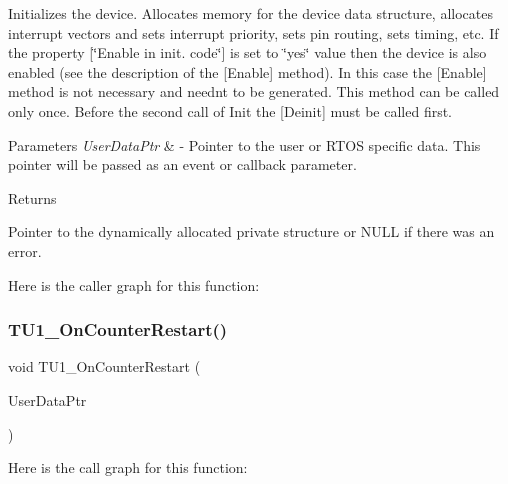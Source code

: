 Initializes the device. Allocates memory for the device data structure, allocates interrupt vectors and sets interrupt priority, sets pin routing, sets timing, etc. If the property \mbox{[}\char`\"{}\+Enable in init. code\char`\"{}\mbox{]} is set to \char`\"{}yes\char`\"{} value then the device is also enabled (see the description of the \mbox{[}Enable\mbox{]} method). In this case the \mbox{[}Enable\mbox{]} method is not necessary and needn\textquotesingle{}t to be generated. This method can be called only once. Before the second call of Init the \mbox{[}Deinit\mbox{]} must be called first. 


\begin{DoxyParams}{Parameters}
{\em User\+Data\+Ptr} & -\/ Pointer to the user or R\+T\+OS specific data. This pointer will be passed as an event or callback parameter. \\
\hline
\end{DoxyParams}
\begin{DoxyReturn}{Returns}

\begin{DoxyItemize}
\item Pointer to the dynamically allocated private structure or N\+U\+LL if there was an error. 
\end{DoxyItemize}
\end{DoxyReturn}
Here is the caller graph for this function\+:
\mbox{\label{group___timer_int_ldd1__module_ga915c714e97fd2a66385fddc37d45352a}} 
\subsubsection{\texorpdfstring{T\+U1\+\_\+\+On\+Counter\+Restart()}{TU1\_OnCounterRestart()}}
{\footnotesize\ttfamily void T\+U1\+\_\+\+On\+Counter\+Restart (\begin{DoxyParamCaption}\item[{\hyperlink{group___p_e___types__module_ga0b66a73f87238a782318aa0be7578e35}{L\+D\+D\+\_\+\+T\+User\+Data} $\ast$}]{User\+Data\+Ptr }\end{DoxyParamCaption})}

Here is the call graph for this function\+:
